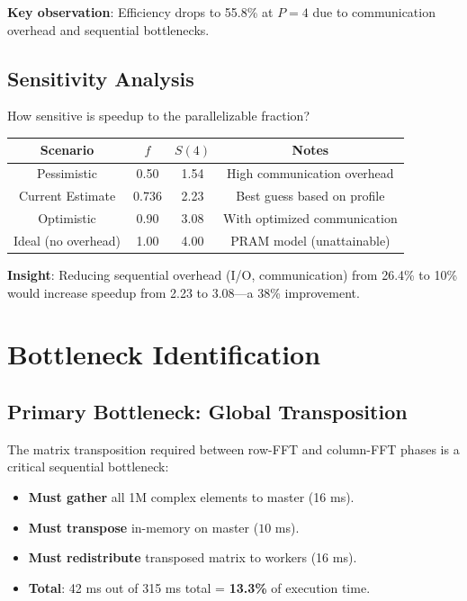 \documentclass[11pt,a4paper]{article}
\theoremstyle{definition}
\begin{document}
\textbf{Key observation}: Efficiency drops to 55.8\% at $P=4$ due to communication overhead and sequential bottlenecks.

\subsection{Sensitivity Analysis}

How sensitive is speedup to the parallelizable fraction?

\begin{table}[h]
    \centering
    \begin{tabular}{cccc}
        \hline
        \textbf{Scenario} & $f$ & $S(4)$ & Notes \\
        \hline
        Pessimistic & 0.50 & 1.54 & High communication overhead \\
        Current Estimate & 0.736 & 2.23 & Best guess based on profile \\
        Optimistic & 0.90 & 3.08 & With optimized communication \\
        Ideal (no overhead) & 1.00 & 4.00 & PRAM model (unattainable) \\
        \hline
    \end{tabular}
\end{table}

\textbf{Insight}: Reducing sequential overhead (I/O, communication) from 26.4\% to 10\% would increase speedup from 2.23 to 3.08—a 38\% improvement.

\section{Bottleneck Identification}

\subsection{Primary Bottleneck: Global Transposition}

The matrix transposition required between row-FFT and column-FFT phases is a critical sequential bottleneck:

\begin{itemize}
    \item \textbf{Must gather} all 1M complex elements to master (16 ms).
    \item \textbf{Must transpose} in-memory on master ($10$ ms).
    \item \textbf{Must redistribute} transposed matrix to workers (16 ms).
    \item \textbf{Total}: 42 ms out of 315 ms total = \textbf{13.3\%} of execution time.
\end{itemize}
\end{document}
